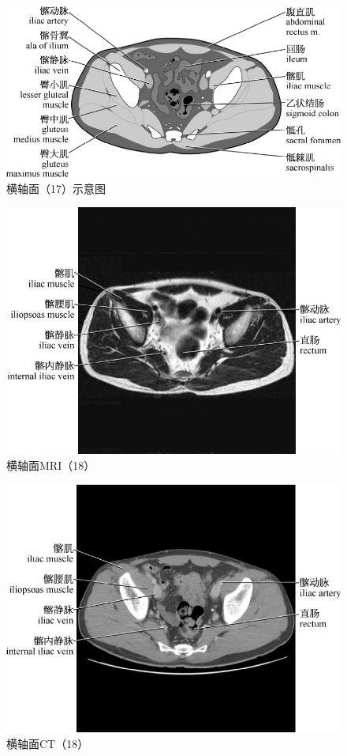 \begin{figure}[!htbp]
 \centering
 \includegraphics{./images/Image00052.jpg}
 \captionsetup{justification=centering}
 \caption{横轴面（17）示意图}
  \end{figure} 
 \FloatBarrier

\begin{figure}[!htbp]
 \centering
 \includegraphics{./images/Image00053.jpg}
 \captionsetup{justification=centering}
 \caption{横轴面MRI（18）}
  \end{figure} 
 \FloatBarrier

\begin{figure}[!htbp]
 \centering
 \includegraphics{./images/Image00054.jpg}
 \captionsetup{justification=centering}
 \caption{横轴面CT（18）}
  \end{figure} 
 \FloatBarrier

